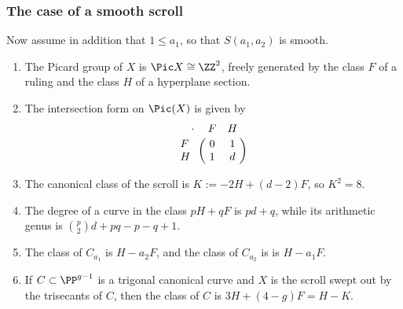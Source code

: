  \subsubsection{The case of a  smooth scroll}

Now assume in addition that $1\leq a_{1}$, so that $S(a_{1}, a_{2})$ is smooth.

\begin{theorem}\label{pic of scroll}

\begin{enumerate}

\item The Picard group of $X$ is $\Pic X \cong \ZZ^2$, freely generated by  the class $F$ of a ruling and the class $H$ of a  hyperplane section. 
\item The
intersection form on $\Pic(X)$ is given by
$$
\bordermatrix{\kern 10pt\cdot&F&H\cr
F&0&1\cr
H&1&d
}
$$

\item The canonical class of the scroll is $K := -2H +(d-2)F$, so $K^2 = 8$.

\item The degree of a curve in the class $pH+qF$ is $pd+q$, while its arithmetic genus is
${p\choose 2}d+pq-p-q+1$.

\item The class of $C_{a_1}$
is $H-a_2F$, and the class of $C_{a_2}$ is 
is $H-a_1F$. 
\item If $C \subset \PP^{g-1}$ is a trigonal canonical curve and $X$ is the scroll swept out by the trisecants of $C$, then the class of $C$ is $3H+(4-g)F = H-K$. 
\end{enumerate}
\end{theorem}

